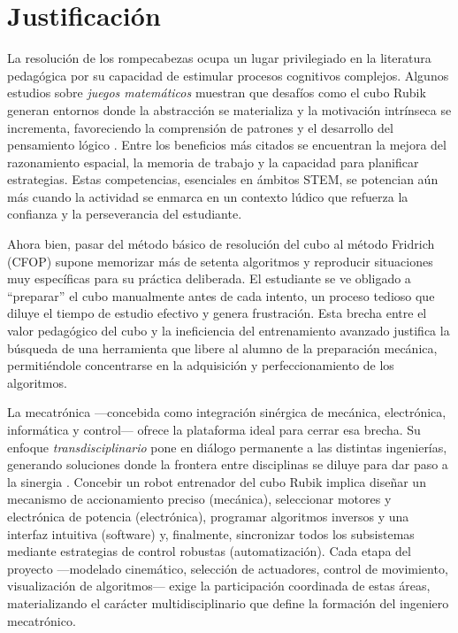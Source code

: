 \section{Justificación}

La resolución de los rompecabezas ocupa un lugar privilegiado en la literatura pedagógica por su capacidad de estimular procesos cognitivos complejos. Algunos estudios sobre \emph{juegos matemáticos} muestran que desafíos como el cubo Rubik generan entornos donde la abstracción se materializa y la motivación intrínseca se incrementa, favoreciendo la comprensión de patrones y el desarrollo del pensamiento lógico \cite{SilvaMera2024}. Entre los beneficios más citados se encuentran la mejora del razonamiento espacial, la memoria de trabajo y la capacidad para planificar estrategias. Estas competencias, esenciales en ámbitos STEM, se potencian aún más cuando la actividad se enmarca en un contexto lúdico que refuerza la confianza y la perseverancia del estudiante.

Ahora bien, pasar del método básico de resolución del cubo al método Fridrich (CFOP) supone memorizar más de setenta algoritmos y reproducir situaciones muy específicas para su práctica deliberada. El estudiante se ve obligado a “preparar” el cubo manualmente antes de cada intento, un proceso tedioso que diluye el tiempo de estudio efectivo y genera frustración. Esta brecha entre el valor pedagógico del cubo y la ineficiencia del entrenamiento avanzado justifica la búsqueda de una herramienta que libere al alumno de la preparación mecánica, permitiéndole concentrarse en la adquisición y perfeccionamiento de los algoritmos.

La mecatrónica —concebida como integración sinérgica de mecánica, electrónica, informática y control— ofrece la plataforma ideal para cerrar esa brecha. Su enfoque \emph{transdisciplinario} pone en diálogo permanente a las distintas ingenierías, generando soluciones donde la frontera entre disciplinas se diluye para dar paso a la sinergia \cite{AquinoRobles2019}.  Concebir un robot entrenador del cubo Rubik implica diseñar un mecanismo de accionamiento preciso (mecánica), seleccionar motores y electrónica de potencia (electrónica), programar algoritmos inversos y una interfaz intuitiva (software) y, finalmente, sincronizar todos los subsistemas mediante estrategias de control robustas (automatización). Cada etapa del proyecto —modelado cinemático, selección de actuadores, control de movimiento, visualización de algoritmos— exige la participación coordinada de estas áreas, materializando el carácter multidisciplinario que define la formación del ingeniero mecatrónico.


